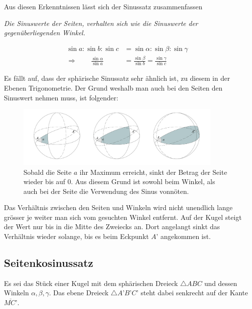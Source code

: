 \begin{refsection}
Aus diesen Erkenntnissen lässt sich der Sinussatz zusammenfassen
\begin{satz}\textit{Die Sinuswerte der Seiten, verhalten sich wie die Sinuswerte der gegenüberliegenden Winkel.}
\label{skript:kugel:satz:Sinussatz}
\end{satz}

\begin{align*}
\sin a : \sin b : \sin c &= \sin \alpha : \sin \beta : \sin \gamma \\
\Rightarrow \quad \quad
\frac{\sin \alpha} {\sin a} &= \frac{\sin \beta} {\sin b} = \frac{\sin \gamma} {\sin c}
\end{align*} 

Es fällt auf, dass der sphärische Sinussatz sehr ähnlich ist, zu diesem in der Ebenen Trigonometrie.
Der Grund weshalb man auch bei den Seiten den Sinuswert nehmen muss, ist folgender:

\begin{figure}[htbp]
\centering
\includegraphics[width=0.9\textwidth]{kugel/SinussatzB.jpg}
\caption{Sobald die Seite $a$ ihr Maximum erreicht, sinkt der Betrag der Seite wieder bis auf 0. Aus diesem Grund ist sowohl beim Winkel, als auch bei der Seite die Verwendung des Sinus vonnöten.}
\end{figure}

Das Verhältnis zwischen den Seiten und Winkeln wird nicht unendlich lange grösser je weiter man sich vom gesuchten Winkel entfernt. Auf der Kugel steigt der Wert nur bis in die Mitte des Zweiecks an. Dort angelangt sinkt das Verhältnis wieder solange, bis es beim Eckpunkt $A’$ angekommen ist.


\subsection{Seitenkosinussatz}
Es sei das Stück einer Kugel mit dem sphärischen Dreieck $\triangle{ABC}$ und dessen Winkeln $\alpha, \beta, \gamma$. Das ebene Dreieck $\triangle{A’B’C’}$ steht dabei senkrecht auf der Kante $\overline{MC’}$.


\end{refsection}

